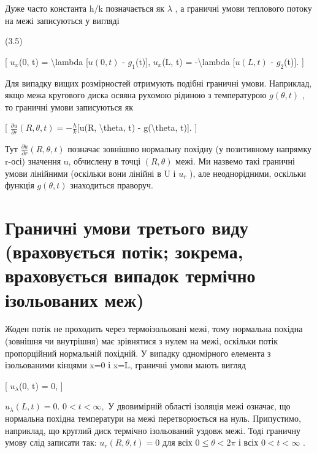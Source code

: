 \documentclass[
]{article}
\begin{document}
Дуже часто константа h/k позначається як \(\lambda\) , а граничні умови
теплового потоку на межі записуються у вигляді

(3.5)

{[} \(u_{x}\)(0, t) = \textbackslash lambda {[}\(u(0, t)\) -
\(g_{1}\)(t){]}, \(u_{x}\)(L, t) = -\textbackslash lambda {[}\(u(L, t)\)
- \(g_{2}\)(t){]}. {]}

Для випадку вищих розмірностей отримують подібні граничні умови.
Наприклад, якщо межа кругового диска осяяна рухомою рідиною з
температурою \(g(\theta,t)\) , то граничні умови записуються як

{[}
\(\frac{\partial u}{\partial r}(R, \theta, t) = -\frac{h}{k}\){[}u(R,
\textbackslash theta, t) - g(\textbackslash theta, t){]}. {]}

Тут \(\frac{\partial u}{\partial r}(R, \theta, t)\) позначає зовнішню
нормальну похідну (у позитивному напрямку r-осі) значення u, обчислену в
точці \((R, \theta)\) межі. Ми назвемо такі граничні умови лінійними
(оскільки вони лінійні в U і \(u_r\) ), але неоднорідними, оскільки
функція \(g(\theta, t)\) знаходиться праворуч.

\section{Граничні умови третього виду (враховується потік; зокрема,
враховується випадок термічно ізольованих
меж)}\label{ux433ux440ux430ux43dux438ux447ux43dux456-ux443ux43cux43eux432ux438-ux442ux440ux435ux442ux44cux43eux433ux43e-ux432ux438ux434ux443-ux432ux440ux430ux445ux43eux432ux443ux454ux442ux44cux441ux44f-ux43fux43eux442ux456ux43a-ux437ux43eux43aux440ux435ux43cux430-ux432ux440ux430ux445ux43eux432ux443ux454ux442ux44cux441ux44f-ux432ux438ux43fux430ux434ux43eux43a-ux442ux435ux440ux43cux456ux447ux43dux43e-ux456ux437ux43eux43bux44cux43eux432ux430ux43dux438ux445-ux43cux435ux436}

Жоден потік не проходить через термоізольовані межі, тому нормальна
похідна (зовнішня чи внутрішня) має зрівнятися з нулем на межі, оскільки
потік пропорційний нормальній похідній. У випадку одномірного елемента з
ізольованими кінцями x=0 і x=L, граничні умови мають вигляд

{[} \(u_{\lambda}\)(0, t) = 0, {]}

\(u_{\lambda}(L, t) = 0.\) \(0 < t < \infty,\) У двовимірній області
ізоляція межі означає, що нормальна похідна температури на межі
перетворюється на нуль. Припустимо, наприклад, що круглий диск термічно
ізольований уздовж межі. Тоді граничну умову слід записати так:
\(u_r(R, \theta, t) = 0\) для всіх \(0 \le \theta < 2\pi\) і всіх
\(0 < t < \infty\) .
\end{document}
